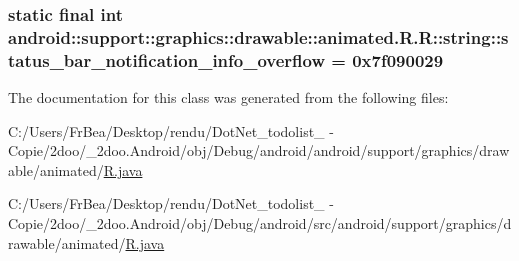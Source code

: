 \hypertarget{classandroid_1_1support_1_1graphics_1_1drawable_1_1animated_1_1_r_1_1string_5f11fbb4d25d7bbaa799cf86fcbfbc0f}{
\subsubsection[{status\_\-bar\_\-notification\_\-info\_\-overflow}]{\setlength{\rightskip}{0pt plus 5cm}static final int android::support::graphics::drawable::animated.R.R::string::status\_\-bar\_\-notification\_\-info\_\-overflow = 0x7f090029}}
\label{classandroid_1_1support_1_1graphics_1_1drawable_1_1animated_1_1_r_1_1string_5f11fbb4d25d7bbaa799cf86fcbfbc0f}




The documentation for this class was generated from the following files:\begin{CompactItemize}
\item 
C:/Users/FrBea/Desktop/rendu/DotNet\_\-todolist\_ - Copie/2doo/\_\-2doo.Android/obj/Debug/android/android/support/graphics/drawable/animated/\hyperlink{android_2support_2graphics_2drawable_2animated_2_r_8java}{R.java}\item 
C:/Users/FrBea/Desktop/rendu/DotNet\_\-todolist\_ - Copie/2doo/\_\-2doo.Android/obj/Debug/android/src/android/support/graphics/drawable/animated/\hyperlink{src_2android_2support_2graphics_2drawable_2animated_2_r_8java}{R.java}\end{CompactItemize}
